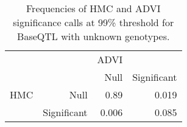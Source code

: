 \begin{table}[ht]
\centering
\caption{Frequencies of HMC and ADVI significance calls at 99\% threshold for BaseQTL with unknown genotypes.} 
\label{tab:nogt-xtab-prop-99}
\begin{tabular}{rr|rr}
   &  & ADVI &  \\ 
    &   & Null & Significant \\ 
   \hline
HMC & Null & 0.89 & 0.019 \\ 
    & Significant & 0.006 & 0.085 \\ 
  \end{tabular}
\end{table}
